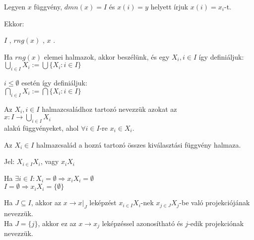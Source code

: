 \begin{frame}
\begin{tcolorbox}[title={Def.: Családok (Indexhalmaz, Indexelt halmaz, Indexelt család)}]
Legyen $x$ függvény, $dmn(x) = I$ és $x(i) = y$ helyett írjuk $x(i) = x_i$-t.\\
\mmedskip

Ekkor:\\
\msmallskip

$I$ , $rng(x)$ , $x$ .\\
\msmallskip

Ha $rng(x)$ elemei halmazok, akkor  beszélünk, és egy $X_i, i \in I$  így definiáljuk:\\
${\bigcup}_{i \in I} X_i := {\bigcup}\{ X_i : i \in I\}$\\
\mmedskip

$i \leq \emptyset$ esetén  így definiáljuk:\\
${\bigcap}_{i \in I} X_i := {\bigcap}\{ X_i : i \in I\}$
\end{tcolorbox}
\end{frame}


\begin{frame}
\begin{tcolorbox}[title={Def.: Kiválasztási függvény, Halmazcsalád Descartes-szorzata}]
Az $X_i, i \in I$ halmazcsaládhoz tartozó  nevezzük azokat az\\
$x : I \rightarrow {\bigcup}_{i \in I} X_i$\\
alakú függvényeket, ahol ${\forall} i \in I$-re $x_i \in X_i$.\\
\mmedskip

Az $X_i \in I$ halmazcsalád  a hozzá tartozó összes kiválasztási függvény halmaza.\\
\mmedskip

Jel: $X_{i \in I} X_i$, vagy $x_iX_i$
\end{tcolorbox}

\begin{tcolorbox}[title={Ész}]
Ha ${\exists} i \in I : X_i = \emptyset \Rightarrow x_iX_i = \emptyset$\\
$I = \emptyset \Rightarrow x_iX_i = \{ \emptyset \}$
\end{tcolorbox}

\begin{tcolorbox}[title={Def.: Leképzás $j$-edik projekciója}]
Ha $J \subseteq I$, akkor az $x \rightarrow x|_J$ leképzést $x_{i \in I}X_i$-nek $x_{j \in J}X_j$-be való projekciójának nevezzük.\\
Ha $J = \{ j \}$, akkor ez az $x \rightarrow x_j$ leképzéssel azonosítható és $j$-edik projekciónak nevezzük.
\end{tcolorbox}
\end{frame}

